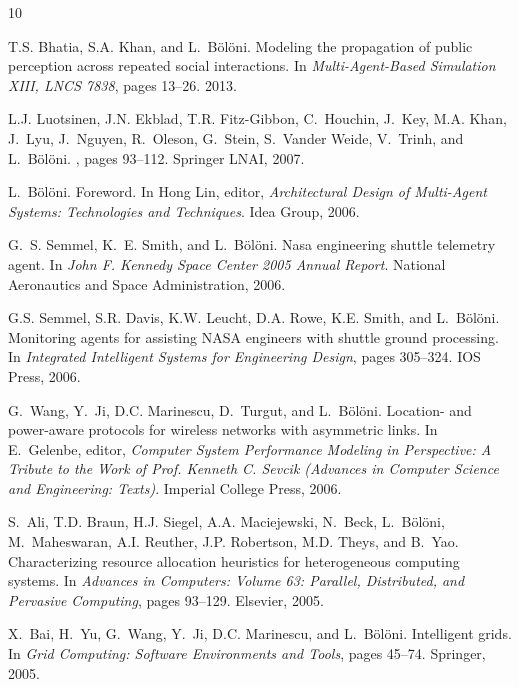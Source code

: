 \begin{thebibliography}{10}

T.S. Bhatia, S.A. Khan, and L.~Bölöni.
\newblock Modeling the propagation of public perception across repeated social
  interactions.
\newblock In {\em Multi-Agent-Based Simulation XIII, LNCS 7838}, pages 13--26.
  2013.

L.J. Luotsinen, J.N. Ekblad, T.R. Fitz-Gibbon, C.~Houchin, J.~Key, M.A. Khan,
  J.~Lyu, J.~Nguyen, R.~Oleson, G.~Stein, S.~Vander Weide, V.~Trinh, and
  L.~Bölöni.
, pages 93--112.
\newblock Springer LNAI, 2007.

L.~Bölöni.
\newblock Foreword.
\newblock In Hong Lin, editor, {\em Architectural Design of Multi-Agent
  Systems: Technologies and Techniques}. Idea Group, 2006.

G.~S. Semmel, K.~E. Smith, and L.~Bölöni.
\newblock Nasa engineering shuttle telemetry agent.
\newblock In {\em John F. Kennedy Space Center 2005 Annual Report}. National
  Aeronautics and Space Administration, 2006.

G.S. Semmel, S.R. Davis, K.W. Leucht, D.A. Rowe, K.E. Smith, and L.~Bölöni.
\newblock Monitoring agents for assisting {NASA} engineers with shuttle ground
  processing.
\newblock In {\em Integrated Intelligent Systems for Engineering Design}, pages
  305--324. IOS Press, 2006.

G.~Wang, Y.~Ji, D.C. Marinescu, D.~Turgut, and L.~Bölöni.
\newblock Location- and power-aware protocols for wireless networks with
  asymmetric links.
\newblock In E.~Gelenbe, editor, {\em Computer System Performance Modeling in
  Perspective: A Tribute to the Work of Prof. Kenneth C. Sevcik (Advances in
  Computer Science and Engineering: Texts)}. Imperial College Press, 2006.

S.~Ali, T.D. Braun, H.J. Siegel, A.A. Maciejewski, N.~Beck, L.~Bölöni,
  M.~Maheswaran, A.I. Reuther, J.P. Robertson, M.D. Theys, and B.~Yao.
\newblock Characterizing resource allocation heuristics for heterogeneous
  computing systems.
\newblock In {\em Advances in Computers: Volume 63: Parallel, Distributed, and
  Pervasive Computing}, pages 93--129. Elsevier, 2005.

X.~Bai, H.~Yu, G.~Wang, Y.~Ji, D.C. Marinescu, and L.~Bölöni.
\newblock Intelligent grids.
\newblock In {\em Grid Computing: Software Environments and Tools}, pages
  45--74. Springer, 2005.


\end{thebibliography}
